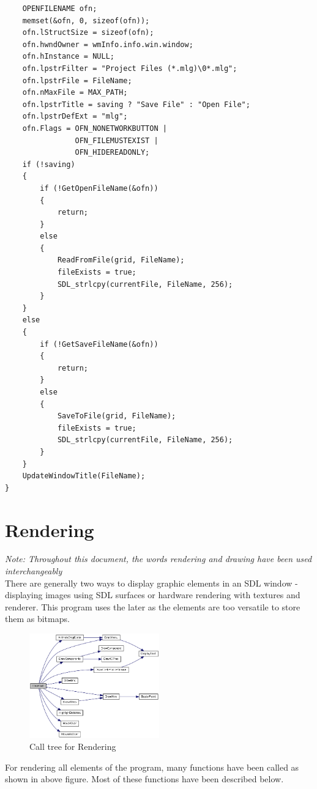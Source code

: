 \documentclass[report]{subfiles}
\begin{document}
\begin{lstlisting}
    OPENFILENAME ofn;
    memset(&ofn, 0, sizeof(ofn));
    ofn.lStructSize = sizeof(ofn);
    ofn.hwndOwner = wmInfo.info.win.window;
    ofn.hInstance = NULL;
    ofn.lpstrFilter = "Project Files (*.mlg)\0*.mlg";
    ofn.lpstrFile = FileName;
    ofn.nMaxFile = MAX_PATH;
    ofn.lpstrTitle = saving ? "Save File" : "Open File";
    ofn.lpstrDefExt = "mlg";
    ofn.Flags = OFN_NONETWORKBUTTON |
                OFN_FILEMUSTEXIST |
                OFN_HIDEREADONLY;
    if (!saving)
    {
        if (!GetOpenFileName(&ofn))
        {
            return;
        }
        else
        {
            ReadFromFile(grid, FileName);
            fileExists = true;
            SDL_strlcpy(currentFile, FileName, 256);
        }
    }
    else
    {
        if (!GetSaveFileName(&ofn))
        {
            return;
        }
        else
        {
            SaveToFile(grid, FileName);
            fileExists = true;
            SDL_strlcpy(currentFile, FileName, 256);
        }
    }
    UpdateWindowTitle(FileName);
}
\end{lstlisting}
    \section{Rendering}
    \textit{Note: Throughout this document, the words rendering and drawing have been used interchangeably}\\
    There are generally two ways to display graphic elements in an SDL window - displaying images using SDL surfaces or hardware rendering with textures and renderer. This program uses the later as the elements are too versatile to store them as bitmaps.
    \begin{figure}[H]
        \centering
        \includegraphics[width=0.5\textwidth]{../graphics/render_call_tree.png}
        \caption{Call tree for Rendering}
    \end{figure}
    For rendering all elements of the program, many functions have been called as shown in above figure. Most of these functions have been described below.
\end{document}
